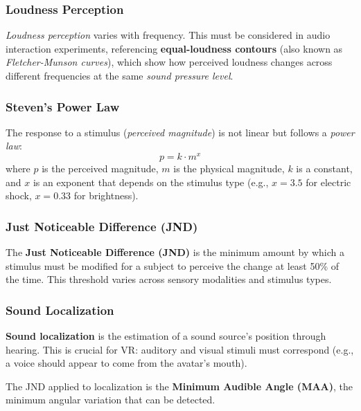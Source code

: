 \documentclass[11pt,a4paper]{article}
\theoremstyle{definition}
\theoremstyle{plain}
\theoremstyle{remark}
\begin{document}
\subsubsection{Loudness Perception}

\textit{Loudness perception} varies with frequency. This must be considered in audio interaction experiments, referencing \textbf{equal-loudness contours} (also known as \textit{Fletcher-Munson curves}), which show how perceived loudness changes across different frequencies at the same \textit{sound pressure level}.

\subsubsection{Steven's Power Law}

The response to a stimulus (\textit{perceived magnitude}) is not linear but follows a \textit{power law}:
\begin{equation}
    p = k \cdot m^x
\end{equation}
where $p$ is the perceived magnitude, $m$ is the physical magnitude, $k$ is a constant, and $x$ is an exponent that depends on the stimulus type (e.g., $x = 3.5$ for electric shock, $x = 0.33$ for brightness).

\subsubsection{Just Noticeable Difference (JND)}

The \textbf{Just Noticeable Difference (JND)} is the minimum amount by which a stimulus must be modified for a subject to perceive the change at least 50\% of the time. This threshold varies across sensory modalities and stimulus types.

\subsubsection{Sound Localization}

\textbf{Sound localization} is the estimation of a sound source's position through hearing. This is crucial for VR: auditory and visual stimuli must correspond (e.g., a voice should appear to come from the avatar's mouth).

The JND applied to localization is the \textbf{Minimum Audible Angle (MAA)}, the minimum angular variation that can be detected.
\end{document}
